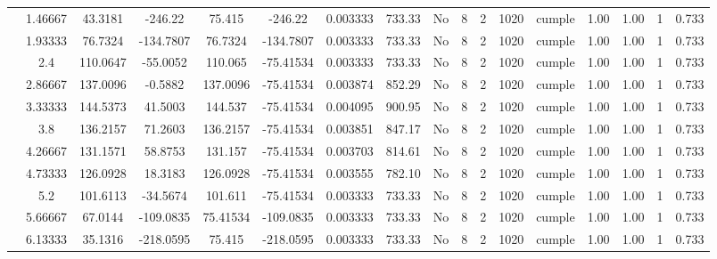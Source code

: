 \begin{table}[H]
{\begin{tabular}{|c|c|c|c|c|c|c|c|c|c|c|c|c|c|c|c|c|}
\cline{2-17}        & 1.46667 & 43.3181 & -246.22 & 75.415 & -246.22 & 0.003333 & 733.33 & No  & 8   & 2   & 1020 & \cellcolor[rgb]{ .776,  .937,  .808}cumple & 1.00 & 1.00 & 1   & 0.733 \bigstrut\\
\cline{2-17}        & 1.93333 & 76.7324 & -134.7807 & 76.7324 & -134.7807 & 0.003333 & 733.33 & No  & 8   & 2   & 1020 & \cellcolor[rgb]{ .776,  .937,  .808}cumple & 1.00 & 1.00 & 1   & 0.733 \bigstrut\\
\cline{2-17}        & 2.4 & 110.0647 & -55.0052 & 110.065 & -75.41534 & 0.003333 & 733.33 & No  & 8   & 2   & 1020 & \cellcolor[rgb]{ .776,  .937,  .808}cumple & 1.00 & 1.00 & 1   & 0.733 \bigstrut\\
\cline{2-17}        & 2.86667 & 137.0096 & -0.5882 & 137.0096 & -75.41534 & 0.003874 & 852.29 & No  & 8   & 2   & 1020 & \cellcolor[rgb]{ .776,  .937,  .808}cumple & 1.00 & 1.00 & 1   & 0.733 \bigstrut\\
\cline{2-17}        & 3.33333 & 144.5373 & 41.5003 & 144.537 & -75.41534 & 0.004095 & 900.95 & No  & 8   & 2   & 1020 & \cellcolor[rgb]{ .776,  .937,  .808}cumple & 1.00 & 1.00 & 1   & 0.733 \bigstrut\\
\cline{2-17}        & 3.8 & 136.2157 & 71.2603 & 136.2157 & -75.41534 & 0.003851 & 847.17 & No  & 8   & 2   & 1020 & \cellcolor[rgb]{ .776,  .937,  .808}cumple & 1.00 & 1.00 & 1   & 0.733 \bigstrut\\
\cline{2-17}        & 4.26667 & 131.1571 & 58.8753 & 131.157 & -75.41534 & 0.003703 & 814.61 & No  & 8   & 2   & 1020 & \cellcolor[rgb]{ .776,  .937,  .808}cumple & 1.00 & 1.00 & 1   & 0.733 \bigstrut\\
\cline{2-17}        & 4.73333 & 126.0928 & 18.3183 & 126.0928 & -75.41534 & 0.003555 & 782.10 & No  & 8   & 2   & 1020 & \cellcolor[rgb]{ .776,  .937,  .808}cumple & 1.00 & 1.00 & 1   & 0.733 \bigstrut\\
\cline{2-17}        & 5.2 & 101.6113 & -34.5674 & 101.611 & -75.41534 & 0.003333 & 733.33 & No  & 8   & 2   & 1020 & \cellcolor[rgb]{ .776,  .937,  .808}cumple & 1.00 & 1.00 & 1   & 0.733 \bigstrut\\
\cline{2-17}        & 5.66667 & 67.0144 & -109.0835 & 75.41534 & -109.0835 & 0.003333 & 733.33 & No  & 8   & 2   & 1020 & \cellcolor[rgb]{ .776,  .937,  .808}cumple & 1.00 & 1.00 & 1   & 0.733 \bigstrut\\
\cline{2-17}        & 6.13333 & 35.1316 & -218.0595 & 75.415 & -218.0595 & 0.003333 & 733.33 & No  & 8   & 2   & 1020 & \cellcolor[rgb]{ .776,  .937,  .808}cumple & 1.00 & 1.00 & 1   & 0.733 \bigstrut\\

\end{tabular}}
\end{table}

